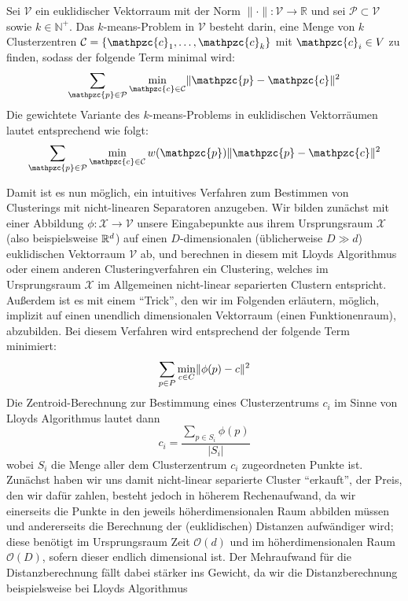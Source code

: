 \begin{definition}
\label{def:kmeans-kmedian-innerproduct}
Sei $\mathcal{V}$ ein euklidischer Vektorraum mit der Norm $\lVert \cdot \rVert : \mathcal{V} \rightarrow \mathbb{R}$
und sei $\mathcal{P} \subset \mathcal{V}$ sowie $k \in \mathbb{N}^{+}$.
Das $k$-means-Problem in $\mathcal{V}$ besteht darin, eine Menge von $k$ Clusterzentren
$\mathcal{C} = \{ \mathpzc{c}_1, \dots, \mathpzc{c}_k \}$ mit $\mathpzc{c}_i \in V$ zu finden, sodass der folgende Term
minimal wird:
\[ \sum_{\mathpzc{p} \in \mathcal{P}} \min_{\mathpzc{c} \in \mathcal{C}} \EuclidSquared{\mathpzc{p}}{\mathpzc{c}} \]
Die gewichtete Variante des $k$-means-Problems in euklidischen Vektorräumen lautet entsprechend wie folgt:
\[ \sum_{\mathpzc{p} \in \mathcal{P}} \min_{\mathpzc{c} \in \mathcal{C}} w(\mathpzc{p})
	\EuclidSquared{\mathpzc{p}}{\mathpzc{c}} \]
\end{definition}
Damit ist es nun möglich, ein intuitives Verfahren zum Bestimmen von Clusterings mit nicht-linearen Separatoren anzugeben.
Wir bilden zunächst mit einer Abbildung $\phi : \mathcal{X} \rightarrow \mathcal{V}$ unsere Eingabepunkte aus ihrem Ursprungsraum
$\mathcal{X}$ (also beispielsweise $\mathbb{R}^{d}$) auf einen $D$-dimensionalen (üblicherweise $D \gg d$) euklidischen
Vektorraum $\mathcal{V}$ ab, und berechnen in diesem mit Lloyds Algorithmus oder einem anderen Clusteringverfahren ein
Clustering, welches im Ursprungsraum $\mathcal{X}$ im Allgemeinen nicht-linear separierten Clustern entspricht.
Außerdem ist es mit einem "`Trick"', den wir im Folgenden erläutern, möglich, implizit auf einen unendlich dimensionalen
Vektorraum (einen Funktionenraum), abzubilden.
Bei diesem Verfahren wird entsprechend der folgende Term minimiert:
\[ \sum_{p \in P} \min_{c \in C} \lVert {\phi(p)} - {c} \rVert^2 \]
Die Zentroid-Berechnung zur Bestimmung eines Clusterzentrums $c_i$ im Sinne von Lloyds Algorithmus lautet dann
\[ c_i = \frac{\sum_{p \in S_i} \phi(p)}{\left|S_i\right|} \]
wobei $S_i$ die Menge aller dem Clusterzentrum $c_i$ zugeordneten Punkte ist. Zunächst haben wir uns damit nicht-linear separierte
Cluster "`erkauft"', der Preis, den wir dafür zahlen, besteht jedoch in höherem Rechenaufwand, da wir einerseits die Punkte
in den jeweils höherdimensionalen Raum abbilden müssen und andererseits die Berechnung der (euklidischen) Distanzen aufwändiger
wird; diese benötigt im Ursprungsraum Zeit $\mathcal{O}(d)$ und im höherdimensionalen Raum $\mathcal{O}(D)$, sofern
dieser endlich dimensional ist. Der Mehraufwand
für die Distanzberechnung fällt dabei stärker ins Gewicht, da wir die Distanzberechnung beispielsweise bei Lloyds Algorithmus
